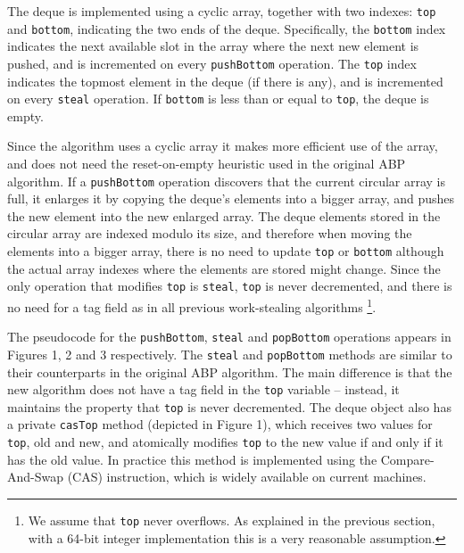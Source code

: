 The deque is implemented using a cyclic array, together with two
indexes: \lstinline!top! and \lstinline!bottom!, indicating the two
ends of the deque. Specifically, the \lstinline!bottom! index
indicates the next available slot in the array where the next new
element is pushed, and is incremented on every \lstinline!pushBottom!
operation. The \lstinline!top! index indicates the topmost element in
the deque (if there is any), and is incremented on every
\lstinline!steal! operation. If \lstinline!bottom! is less than or
equal to \lstinline!top!, the deque is empty.

Since the algorithm uses a cyclic array it makes more efficient use of
the array, and does not need the reset-on-empty heuristic used in the
original ABP algorithm. If a \lstinline!pushBottom! operation
discovers that the current circular array is full, it enlarges it by
copying the deque's elements into a bigger array, and pushes the new
element into the new enlarged array. The deque elements stored in the
circular array are indexed modulo its size, and therefore when moving
the elements into a bigger array, there is no need to update
\lstinline!top! or \lstinline!bottom! although the actual array
indexes where the elements are stored might change. Since the only
operation that modifies \lstinline!top! is \lstinline!steal!,
\lstinline!top! is never decremented, and there is no need for a tag
field as in all previous work-stealing algorithms \footnote{We assume
  that \lstinline!top! never overflows. As explained in the previous
  section, with a 64-bit integer implementation this is a very
  reasonable assumption.}.


The pseudocode for the \lstinline!pushBottom!, \lstinline!steal! and
\lstinline!popBottom! operations appears in Figures 1, 2 and 3
respectively. The \lstinline!steal! and \lstinline!popBottom! methods
are similar to their counterparts in the original ABP algorithm. The
main difference is that the new algorithm does not have a tag field in
the \lstinline!top! variable -- instead, it maintains the property
that \lstinline!top! is never decremented. The deque object also has a
private \lstinline!casTop! method (depicted in Figure 1), which
receives two values for \lstinline!top!, old and new, and atomically
modifies \lstinline!top! to the new value if and only if it has the
old value. In practice this method is implemented using the
Compare-And-Swap (CAS) instruction, which is widely available on
current machines.

